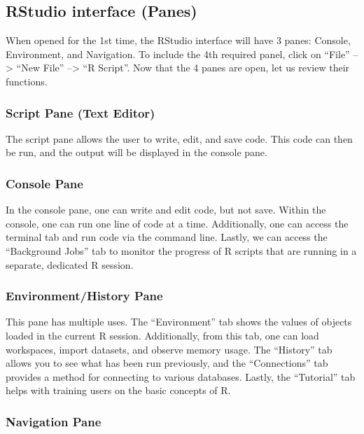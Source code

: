 \documentclass[
  letterpaper,
  DIV=11,
  numbers=noendperiod]{scrreprt}
\begin{document}
\subsection{RStudio interface (Panes)}\label{rstudio-interface-panes}

When opened for the 1st time, the RStudio interface will have 3 panes:
Console, Environment, and Navigation. To include the 4th required panel,
click on ``File'' --\textgreater{} ``New File'' --\textgreater{} ``R
Script''. Now that the 4 panes are open, let us review their functions.

\subsubsection{Script Pane (Text Editor)}\label{script-pane-text-editor}

The script pane allows the user to write, edit, and save code. This code
can then be run, and the output will be displayed in the console pane.

\subsubsection{Console Pane}\label{console-pane}

In the console pane, one can write and edit code, but not save. Within
the console, one can run one line of code at a time. Additionally, one
can access the terminal tab and run code via the command line. Lastly,
we can access the ``Background Jobs'' tab to monitor the progress of R
scripts that are running in a separate, dedicated R session.

\subsubsection{Environment/History Pane}\label{environmenthistory-pane}

This pane has multiple uses. The ``Environment'' tab shows the values of
objects loaded in the current R session. Additionally, from this tab,
one can load workspaces, import datasets, and observe memory usage. The
``History'' tab allows you to see what has been run previously, and the
``Connections'' tab provides a method for connecting to various
databases. Lastly, the ``Tutorial'' tab helps with training users on the
basic concepts of R.

\subsubsection{Navigation Pane}\label{navigation-pane}
\end{document}
